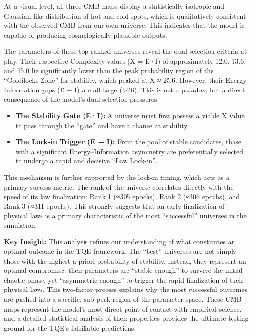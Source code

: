 At a visual level, all three CMB maps display a statistically isotropic
and Gaussian-like distribution of hot and cold spots, which is
qualitatively consistent with the observed CMB from our own universe.
This indicates that the model is capable of producing cosmologically
plausible outputs.

The parameters of these top-ranked universes reveal the dual selection
criteria at play. Their respective Complexity values (X = E·I) of
approximately 12.0, 13.6, and 15.0 lie significantly lower than the peak
probability region of the ``Goldilocks Zone'' for stability, which
peaked at X ≈ 25.6. However, their Energy--Information gaps (\textbar E
− I\textbar) are all large (\textgreater26). This is not a paradox, but
a direct consequence of the model's dual selection pressures:

\begin{itemize}
\tightlist
\item
  \textbf{The Stability Gate (E·I):} A universe must first possess a
  viable X value to pass through the ``gate'' and have a chance at
  stability.\\
\item
  \textbf{The Lock-in Trigger (\textbar E − I\textbar):} From the pool
  of stable candidates, those with a significant Energy--Information
  asymmetry are preferentially selected to undergo a rapid and decisive
  ``Law Lock-in''.
\end{itemize}

This mechanism is further supported by the lock-in timing, which acts as
a primary success metric. The rank of the universe correlates directly
with the speed of its law finalization: Rank 1 (≈305 epochs), Rank 2
(≈306 epochs), and Rank 3 (≈311 epochs). This strongly suggests that an
early finalization of physical laws is a primary characteristic of the
most ``successful'' universes in the simulation.

\textbf{Key Insight:} This analysis refines our understanding of what
constitutes an optimal outcome in the TQE framework. The ``best''
universes are not simply those with the highest a priori probability of
stability. Instead, they represent an optimal compromise: their
parameters are ``stable enough'' to survive the initial chaotic phase,
yet ``asymmetric enough'' to trigger the rapid finalization of their
physical laws. This two-factor process explains why the most successful
outcomes are pushed into a specific, sub-peak region of the parameter
space. These CMB maps represent the model's most direct point of contact
with empirical science, and a detailed statistical analysis of their
properties provides the ultimate testing ground for the TQE's
falsifiable predictions.


